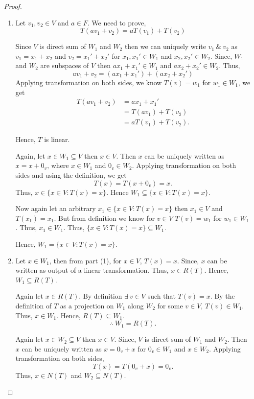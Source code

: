 \documentclass[12pt, a4paper]{article}
\theoremstyle{definition}
\theoremstyle{remark}
\begin{document}
\begin{proof}
    \begin{enumerate}
        \item Let $v_1, v_2 \in V$ and $a \in F$. We need to prove,
        $$T(av_1 + v_2) = a T(v_1) + T(v_2)$$

        Since $V$ is direct sum of $W_1$ and $W_2$ then we can uniquely write $v_1 \ \& \ v_2$ as $v_1 = x_1 + x_2$ and $v_2 = x_1' + x_2'$ for $x_1, x_1' \in W_1$ and $x_2, x_2' \in W_2$. Since, $W_1$ and $W_2$ are subspaces of $V$ then $ax_1 + x_1' \in W_1$ and $ax_2 + x_2' \in W_2$. Thus,
        $$av_1 + v_2 = (ax_1 + x_1') + (ax_2 + x_2')$$
        Applying transformation on both sides, we know $T(v) = w_1$ for $w_1 \in W_1$, we get
        \begin{align*}
            T(av_1 + v_2) &= ax_1 + x_1'\\
            &= T(av_1) + T(v_2)\\
            &= a T(v_1) + T(v_2).
        \end{align*}

        Hence, $T$ is linear.

        Again, let $x \in W_1 \subseteq V$ then $x \in V$. Then $x$ can be uniquely written as $x = x + 0_v$, where $x \in W_1$ and $0_v \in W_2$. Applying transformation on both sides and using the definition, we get
        $$T(x) = T(x + 0_v) = x.$$
        Thus, $x \in \{x \in V : T(x) = x\}$. Hence $W_1 \subseteq \{x \in V : T(x) = x\}$.

        Now again let an arbitrary $x_1 \in \{x \in V : T(x) = x\}$ then $x_1 \in V$ and $T(x_1) = x_1$. But from definition we know for $v \in V$ $T(v) = w_1$ for $w_1 \in W_1$. Thus, $x_1 \in W_1$. Thus, $\{x \in V : T(x) = x\} \subseteq W_1$.

        Hence, $W_1=\{x \in V : T(x)=x\}$.

        \item Let $x \in W_1$, then from part (1), for $x \in V$, $T(x) = x$. Since, $x$ can be written as output of a linear transformation. Thus, $x \in R(T)$. Hence, $W_1 \subseteq R(T)$.

        Again let $x \in R(T)$. By definition $\exists\ v \in V$ such that $T(v) = x$. By the definition of $T$ as a projection on $W_1$ along $W_2$ for some $v \in V$, $T(v) \in W_1$. Thus, $x \in W_1$. Hence, $R(T) \subseteq W_1$.\[\therefore \ W_1 = R(T).\]

        Again let $x \in W_2 \subseteq V$ then $x \in V$. Since, $V$ is direct sum of $W_1$ and $W_2$. Then $x$ can be uniquely written as $x = 0_v + x$ for $0_v \in W_1$ and $x \in W_2$. Applying transformation on both sides,
        $$T(x) = T(0_v + x) = 0_v.$$
        Thus, $x \in N(T)$ and $W_2 \subseteq N(T)$.


\end{enumerate}
\end{proof}
\end{document}
